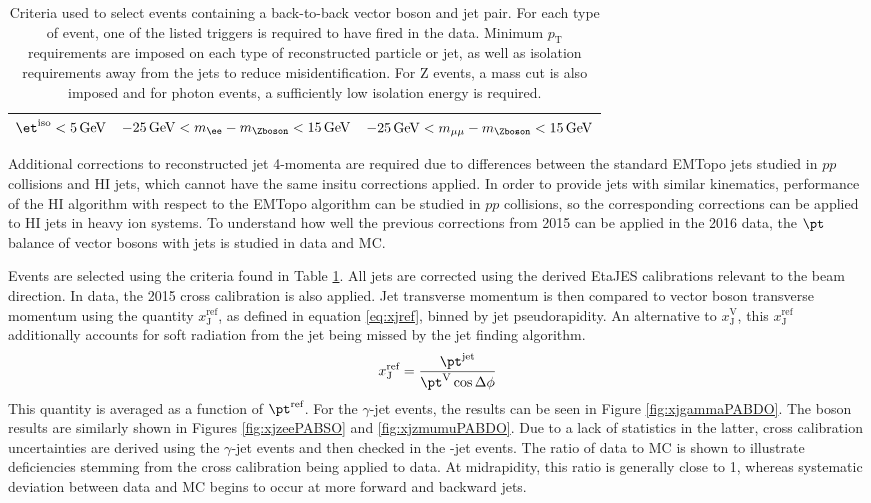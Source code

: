 \documentclass[NOTE, atlasdraft=true, texlive=2016, USenglish]{\ATLASLATEXPATH atlasdoc}
\begin{document}
\begin{center}
\begin{table}
{\begin{tabular}{| l | l | l |}
	{\small $\et^{\text{iso}} < \SI{5}{GeV}$}& {\small $\SI{-25}{\GeV} < m_{\ee} - m_{\Zboson} < \SI{15}{GeV}$} & {\small $\SI{-25}{\GeV} < m_{\mu\mu} - m_{\Zboson} < \SI{15}{GeV}$} \\ \hline
\end{tabular}
}
\caption{Criteria used to select events containing a back-to-back vector boson and jet pair. For each type of event, one of the listed triggers is required to have fired in the data. Minimum $p_{\text{T}}$ requirements are imposed on each type of reconstructed particle or jet, as well as isolation requirements away from the jets to reduce misidentification. For Z events, a mass cut is also imposed and for photon events, a sufficiently low isolation energy is required.}
\label{tab:eventSelection}
\end{table}
\end{center}

Additional corrections to reconstructed jet 4-momenta are required due to differences between the standard EMTopo jets studied in $pp$ collisions and HI jets, which cannot have the same insitu corrections applied. In order to provide jets with similar kinematics, performance of the HI algorithm with respect to the EMTopo algorithm can be studied in $pp$ collisions, so the corresponding corrections can be applied to HI jets in heavy ion systems. To understand how well the previous corrections from 2015 can be applied in the 2016 data, the $\pt$ balance of vector bosons with jets is studied in data and MC.\par
Events are selected using the criteria found in Table \ref{tab:eventSelection}. All jets are corrected using the derived EtaJES calibrations relevant to the beam direction. In data, the 2015 cross calibration is also applied. Jet transverse momentum is then compared to vector boson transverse momentum using the quantity $x_{\text{J}}^{\text{ref}}$, as defined in equation \ref{eq:xjref}, binned by jet pseudorapidity. An alternative to $x_{\text{J}}^{\text{V}}$, this $x_{\text{J}}^{\text{ref}}$ additionally accounts for soft radiation from the jet being missed by the jet finding algorithm.
\begin{equation}
	x_{\text{J}}^{\text{ref}} = \frac{\pt^{\text{jet}}}{\pt^{\text{V}} \cos{\Delta\phi}}
	\label{eq:xjref}
\end{equation}
This quantity is averaged as a function of $\pt^{\text{ref}}$. For the $\gamma$-jet events, the results can be seen in Figure \ref{fig:xjgammaPABDO}. The \Zboson boson results are similarly shown in Figures \ref{fig:xjzeePABSO} and \ref{fig:xjzmumuPABDO}. Due to a lack of statistics in the latter, cross calibration uncertainties are derived using the $\gamma$-jet events and then checked in the \Zboson-jet events. The ratio of data to MC is shown to illustrate deficiencies stemming from the cross calibration being applied to data. At midrapidity, this ratio is generally close to 1, whereas systematic deviation between data and MC begins to occur at more forward and backward jets.\par
\end{document}
